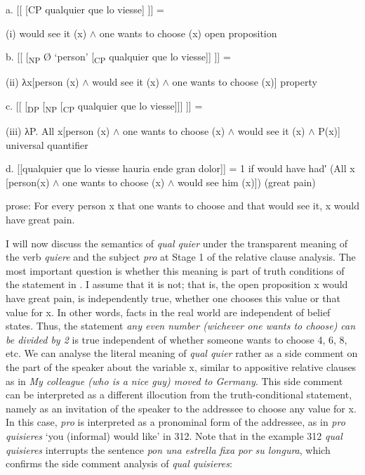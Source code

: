   a.  [[ [CP qualquier que lo viesse] ]] =   

    (i) would see it (x) ${\wedge}$ one wants to choose (x)  open proposition

  b.  [[ [\textsubscript{NP} Ø ‘person’ [\textsubscript{CP} qualquier que lo viesse]] ]] =  

    (ii) λx[person (x) ${\wedge}$ would see it (x) ${\wedge}$ one wants to choose (x)]  property

  c.  [[ [\textsubscript{DP} [\textsubscript{NP} [\textsubscript{CP} qualquier que lo viesse]]] ]] =  

    (iii) λP. All x[person (x) ${\wedge}$ one wants to choose (x) ${\wedge}$ would see it (x) ${\wedge}$ P(x)]  universal quantifier

  d.  [[qualquier que lo viesse hauria ende gran dolor]] = 1 if would have had′ (All x [person(x) ${\wedge}$ one wants to choose (x) ${\wedge}$ would see him (x)]) (great pain)  

    prose: For every person x that one wants to choose and that would see it, x would have great pain.

I will now discuss the semantics of \textit{qual quier} under the transparent meaning of the verb \textit{quiere} and the subject \textit{pro} at Stage 1 of the relative clause analysis. The most important question is whether this meaning is part of truth conditions of the statement in . I assume that it is not; that is, the open proposition x would have great pain, is independently true, whether one chooses this value or that value for x. In other words, facts in the real world are independent of belief states. Thus, the statement \textit{any even number (wichever one wants to choose) can be divided by 2} is true independent of whether someone wants to choose 4, 6, 8, etc. We can analyse the literal meaning of \textit{qual quier} rather as a side comment on the part of the speaker about the variable x, similar to appositive relative clauses as in \textit{My colleague (who is a nice guy) moved to Germany}. This side comment can be interpreted as a different illocution from the truth-conditional statement, namely as an invitation of the speaker to the addressee to choose any value for x. In this case, \textit{pro} is interpreted as a pronominal form of the addressee, as in \textit{pro} \textit{quisieres} ‘you (informal) would like’ in 312. Note that in the example 312 \textit{qual quisieres} interrupts the sentence \textit{pon una estrella fixa por su longura}, which confirms the side comment analysis of \textit{qual quisieres}: 

